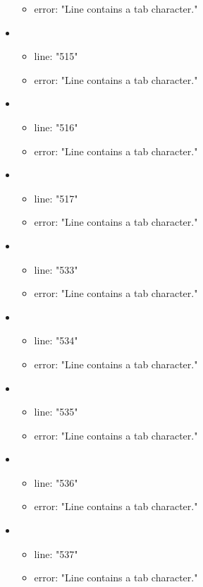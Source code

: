\begin{itemize}
\begin{itemize}
		\item error: "Line contains a tab character." 
	\end{itemize}
	\item 
	\begin{itemize} 
		\item line: "515" 
		\item error: "Line contains a tab character." 
	\end{itemize}
	\item 
	\begin{itemize} 
		\item line: "516" 
		\item error: "Line contains a tab character." 
	\end{itemize}
	\item 
	\begin{itemize} 
		\item line: "517" 
		\item error: "Line contains a tab character." 
	\end{itemize}
	\item 
	\begin{itemize} 
		\item line: "533" 
		\item error: "Line contains a tab character." 
	\end{itemize}
	\item 
	\begin{itemize} 
		\item line: "534" 
		\item error: "Line contains a tab character." 
	\end{itemize}
	\item 
	\begin{itemize} 
		\item line: "535" 
		\item error: "Line contains a tab character." 
	\end{itemize}
	\item 
	\begin{itemize} 
		\item line: "536" 
		\item error: "Line contains a tab character." 
	\end{itemize}
	\item 
	\begin{itemize} 
		\item line: "537" 
		\item error: "Line contains a tab character." 
	\end{itemize}

\end{itemize}
